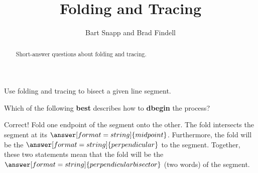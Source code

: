 \documentclass[nooutcomes]{ximera}
\title{Folding and Tracing}
\author{Bart Snapp and Brad Findell}
\begin{document}
\begin{abstract}
Short-answer questions about folding and tracing. 
\end{abstract}
\maketitle

%


\begin{problem}
Use folding and tracing to bisect a given line segment. 
\begin{image}
\end{image}
Which of the following \textbf{best} describes how to \textbf{dbegin} the process?  
\begin{multipleChoice}
\end{multipleChoice}
\begin{problem}
Correct!  Fold one endpoint of the segment onto the other.  The fold intersects the segment at its $\answer[format=string]{midpoint}$.  
Furthermore, the fold will be the $\answer[format=string]{perpendicular}$ to the segment.  Together, these two statements mean that the fold 
will be the $\answer[format=string]{perpendicular bisector}$ (two words) of the segment.
\end{problem}
\end{problem}
\end{document}
